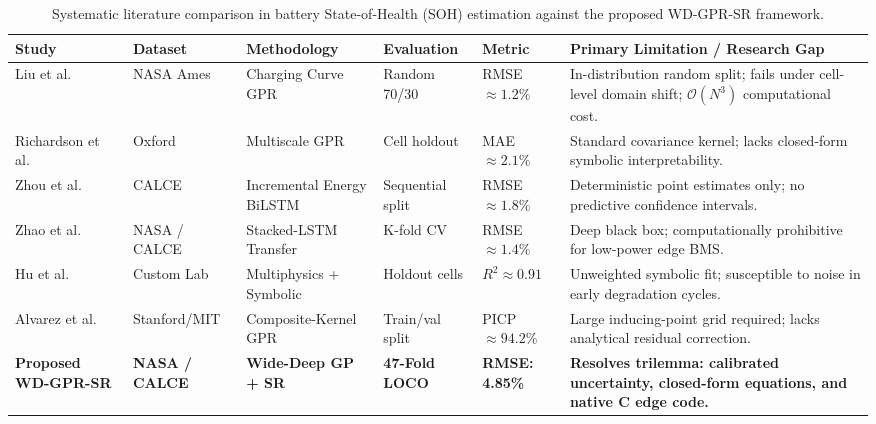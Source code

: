 \documentclass[a4paper,fleqn]{cas-sc}
\begin{document}
\begin{table}[pos=htbp]
\centering
\caption{Systematic literature comparison in battery State-of-Health (SOH) estimation against the proposed WD-GPR-SR framework.}
\label{tab:literature_comparison}
\footnotesize
\renewcommand{\arraystretch}{1.2}
\setlength{\tabcolsep}{3.5pt}
\begin{tabular}{p{2.2cm}p{1.7cm}p{2.6cm}p{2.2cm}p{2.0cm}p{4.7cm}}
\toprule
\textbf{Study} & \textbf{Dataset} & \textbf{Methodology} & \textbf{Evaluation} & \textbf{Metric} & \textbf{Primary Limitation / Research Gap} \\
\midrule
Liu et al.~\cite{liu2018novel} & NASA Ames & Charging Curve GPR & Random 70/30 & RMSE $\approx 1.2\%$ & In-distribution random split; fails under cell-level domain shift; $\mathcal{O}(N^3)$ computational cost. \\
Richardson et al.~\cite{richardson2019multiscale} & Oxford & Multiscale GPR & Cell holdout & MAE $\approx 2.1\%$ & Standard covariance kernel; lacks closed-form symbolic interpretability. \\
Zhou et al.~\cite{zhou2023bilstm} & CALCE & Incremental Energy BiLSTM & Sequential split & RMSE $\approx 1.8\%$ & Deterministic point estimates only; no predictive confidence intervals. \\
Zhao et al.~\cite{zhao2024stacked} & NASA / CALCE & Stacked-LSTM Transfer & K-fold CV & RMSE $\approx 1.4\%$ & Deep black box; computationally prohibitive for low-power edge BMS. \\
Hu et al.~\cite{hu2026multiphysics} & Custom Lab & Multiphysics + Symbolic & Holdout cells & $R^2 \approx 0.91$ & Unweighted symbolic fit; susceptible to noise in early degradation cycles. \\
Alvarez et al.~\cite{alvarez2026uncertainty} & Stanford/MIT & Composite-Kernel GPR & Train/val split & PICP $\approx 94.2\%$ & Large inducing-point grid required; lacks analytical residual correction. \\
\textbf{Proposed WD-GPR-SR} & \textbf{NASA / CALCE} & \textbf{Wide-Deep GP + SR} & \textbf{47-Fold LOCO} & \textbf{RMSE: 4.85\%} & \textbf{Resolves trilemma: calibrated uncertainty, closed-form equations, and native C edge code.} \\
\bottomrule
\end{tabular}
\end{table}
\end{document}
